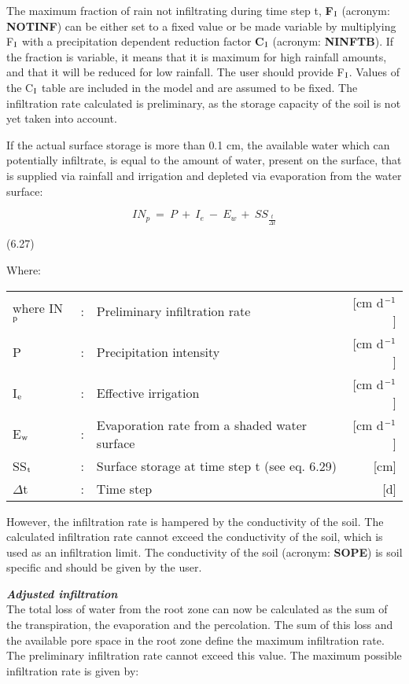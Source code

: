 The maximum fraction of rain not infiltrating during time step t, {\bf F$_{{\rm I}}$} (acronym: {\bf NOTINF})
can be either set to a fixed value or be made variable by multiplying F$_{{\rm I}}$ with a precipita\-tion dependent reduction factor {\bf C$_{{\rm I}}$} (acronym: {\bf NINFTB}). If the fraction is variable, it
means that it is maximum for high rainfall amounts, and that it will be reduced for low
rainfall. The user should provide F$_{{\rm I}}$. Values of the C$_{{\rm I}}$ table are included in the model and
are assumed to be fixed. The infiltration rate calculated is preliminary, as the storage
capacity of the soil is not yet taken into account. 


If the actual surface storage is more than 0.1 cm, the available water which can potential\-ly infiltrate, is equal to the amount of water, present on the surface, that is supplied via
rainfall and irrigation and depleted via evaporation from the water surface:

\begin{equation}
IN_{p} ~=~P~+~I _{e} ~-~ E _{w~} +~ SS _{\frac{t}{\Delta t}} 
\end{equation}

 
\strut\hfill (6.27)

Where:\\
\begin{tabularx}{\textwidth}{llXr}



where IN$_{{\rm p}}$ &:& Preliminary infiltration rate  & [cm d$^{{\rm -1}}$]\\
P &:& Precipitation intensity  & [cm d$^{{\rm -1}}$]\\
I$_{{\rm e}}$ &:& Effective irrigation  & [cm d$^{{\rm -1}}$]\\
E$_{{\rm w}}$ &:& Evaporation rate from a shaded water surface  & [cm d$^{{\rm -1}}$]\\
SS$_{{\rm t}}$ &:& Surface storage at time step t (see eq. 6.29)  & [cm]\\
$\Delta$t &:& Time step  & [d]
\end{tabularx}

 
However, the infiltration rate is hampered by the conductivity of the soil. The calculated
infiltration rate cannot exceed the conductivity of the soil, which is used as an infiltration
limit. The conductivity of the soil (acronym: {\bf SOPE}) is soil specific and should be given
by the user.



{\bf {\it Adjusted infiltration\/}}\\
The total loss of water from the root zone can now be calculated as the sum of the
{\nobreak}transpiration, the evaporation and the perco\-lation. The sum of this loss and the available
pore space in the root zone define the maximum infiltra\-tion rate. The preliminary
infiltration rate cannot exceed this value. The maximum possible infiltration rate is given
by:

